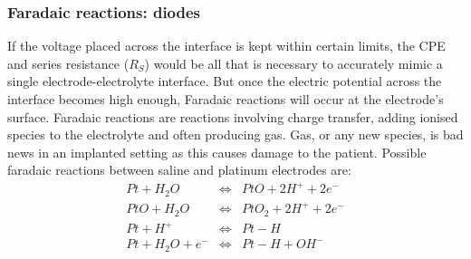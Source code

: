     \subsubsection{Faradaic reactions: diodes}
      If the voltage placed across the interface is kept within certain limits, the CPE and series resistance ($R_{S}$) would be all that is necessary to accurately mimic a single electrode-electrolyte interface.
      But once the electric potential across the interface becomes high enough, Faradaic reactions will occur at the electrode's surface.
      Faradaic reactions are reactions involving charge transfer, adding ionised species to the electrolyte and often producing gas.
      Gas, or any new species, is bad news in an implanted setting as this causes damage to the patient.
      Possible faradaic reactions between saline and platinum electrodes are:
      \begin{eqnarray}
          Pt + H_{2}O &\Leftrightarrow& PtO + 2 H^{+} + 2 e^{-}\\
          PtO + H_{2}O &\Leftrightarrow& PtO_{2} + 2 H^{+} + 2e^{-}\\
          Pt + H^{+} & \Leftrightarrow & Pt-H\\
          Pt + H_{2}O + e^{-} &\Leftrightarrow& Pt-H+OH^{-}
      \end{eqnarray}

